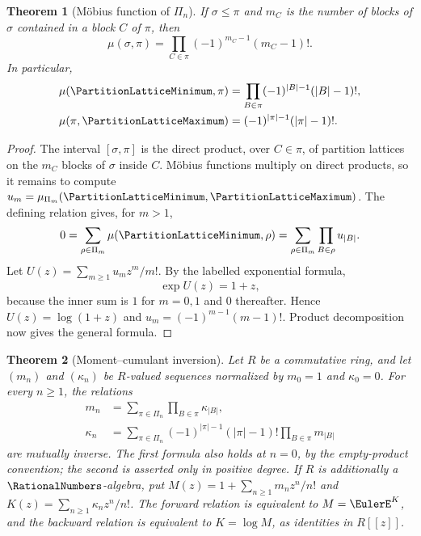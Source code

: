 \documentclass[11pt,a4paper,oneside,openany]{book}
\newtheorem{theorem}{Theorem}[chapter]
\theoremstyle{definition}
\theoremstyle{remark}
\begin{document}
\begin{theorem}[Möbius function of $\Pi_n$]
\label{thm:merged-partition-mobius}
If $\sigma\leq\pi$ and $m_C$ is the number of blocks of $\sigma$ contained in
a block $C$ of $\pi$, then
\begin{equation}
 \mu(\sigma,\pi)=\prod_{C\in\pi}(-1)^{m_C-1}(m_C-1)!.              \label{eq:merged-partition-mobius}
\end{equation}
In particular,
\begin{align}
 \mu(\PartitionLatticeMinimum,\pi)&=\prod_{B\in\pi}(-1)^{|B|-1}(|B|-1)!,         \label{eq:merged-partition-mobius-bottom}\\
 \mu(\pi,\PartitionLatticeMaximum)&=(-1)^{|\pi|-1}(|\pi|-1)!.                    \label{eq:merged-partition-mobius-top}
\end{align}
\end{theorem}

\begin{proof}
The interval $[\sigma,\pi]$ is the direct product, over $C\in\pi$, of
partition lattices on the $m_C$ blocks of $\sigma$ inside $C$.  Möbius
functions multiply on direct products, so it remains to compute
$u_m=\mu_{\Pi_m}(\PartitionLatticeMinimum,\PartitionLatticeMaximum)$.  The defining relation gives, for
$m>1$,
\[
 0=\sum_{\rho\in\Pi_m}\mu(\PartitionLatticeMinimum,\rho)
  =\sum_{\rho\in\Pi_m}\prod_{B\in\rho}u_{|B|}.
\]
Let $U(z)=\sum_{m\geq1}u_mz^m/m!$.  By the labelled exponential formula,
\[
 \exp U(z)=1+z,
\]
because the inner sum is $1$ for $m=0,1$ and $0$ thereafter.  Hence
$U(z)=\log(1+z)$ and $u_m=(-1)^{m-1}(m-1)!$.  Product decomposition now gives
the general formula.
\end{proof}

\begin{theorem}[Moment--cumulant inversion]
\label{thm:merged-moment-cumulant}
Let $R$ be a commutative ring, and let $(m_n)$ and $(\kappa_n)$ be
$R$-valued sequences normalized by $m_0=1$ and $\kappa_0=0$.
For every $n\geq1$, the relations
\begin{align}
 m_n&=\sum_{\pi\in\Pi_n}\prod_{B\in\pi}\kappa_{|B|},               \label{eq:merged-moment-cumulant-forward}\\
 \kappa_n&=\sum_{\pi\in\Pi_n}(-1)^{|\pi|-1}(|\pi|-1)!
                 \prod_{B\in\pi}m_{|B|}                            \label{eq:merged-moment-cumulant-backward}
\end{align}
are mutually inverse.  The first formula also holds at $n=0$, by the
empty-product convention; the second is asserted only in positive degree.
If $R$ is additionally a $\RationalNumbers$-algebra, put
$M(z)=1+\sum_{n\geq1}m_nz^n/n!$ and
$K(z)=\sum_{n\geq1}\kappa_nz^n/n!$.
The forward relation is equivalent to $M=\EulerE^K$, and the backward
relation is equivalent to $K=\log M$, as identities in $R[[z]]$.
\end{theorem}
\end{document}
